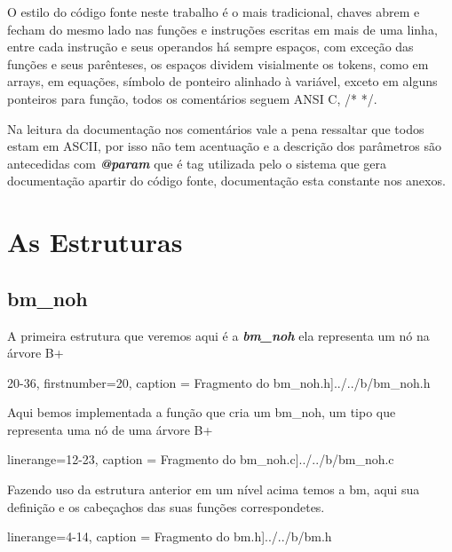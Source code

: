 \documentclass [a4paper, 12pt] {article}
\newcommand{\enf}[1]{\emph{\textbf{#1}}}
\begin{document}
O estilo do código fonte neste trabalho é o mais tradicional, chaves abrem e fecham do mesmo lado
nas funções e instruções escritas em mais de uma linha,
entre cada instrução e seus operandos há sempre espaços, com exceção das funções e seus parênteses, 
os espaços dividem visialmente os tokens, como em arrays, em equações, símbolo 
de ponteiro alinhado à variável, exceto em alguns ponteiros para função, todos os comentários seguem ANSI C, /* */.

Na leitura da documentação nos comentários vale a pena ressaltar que todos estam em ASCII,
por isso não tem acentuação e a descrição dos parâmetros são antecedidas com \enf{@param}
que é tag utilizada pelo o sistema que gera documentação apartir do código fonte,
documentação esta constante nos anexos.

\section {As Estruturas}
\subsection {bm_noh}
\noindent A primeira estrutura que veremos aqui é a \enf{bm_noh} ela representa um nó na árvore B+

{20-36}, firstnumber=20, caption = {Fragmento do bm_noh.h}]{../../b/bm\_noh.h}

\noindent Aqui bemos implementada a função que cria um bm_noh, um tipo que representa uma nó de uma árvore B+

 linerange={12-23}, caption = {Fragmento do bm_noh.c}]{../../b/bm\_noh.c}

\noindent Fazendo uso da estrutura anterior em um nível acima temos a bm, aqui 
sua definição e os cabeçaçhos das suas funções correspondetes.

 linerange={4-14}, caption = {Fragmento do bm.h}]{../../b/bm.h}



\section{}
\nocite{*}
{}

\end{document}
